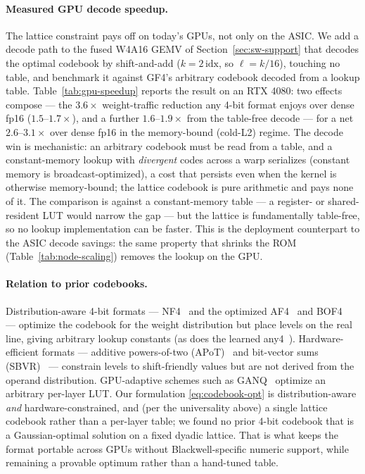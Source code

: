 \paragraph{Measured GPU decode speedup.} The lattice constraint pays off on
today's GPUs, not only on the ASIC. We add a decode path to the fused
W4A16 GEMV of Section~\ref{sec:sw-support} that decodes the optimal codebook by
shift-and-add ($k=2\,\mathrm{idx}$, so $\ell=k/16$), touching no table, and
benchmark it against GF4's arbitrary codebook decoded from a lookup table.
Table~\ref{tab:gpu-speedup} reports the result on an RTX 4080: two effects
compose --- the $3.6\times$ weight-traffic reduction any 4-bit format enjoys over
dense fp16 ($1.5$--$1.7\times$), and a further $1.6$--$1.9\times$ from the
table-free decode --- for a net $2.6$--$3.1\times$ over dense fp16 in the
memory-bound (cold-L2) regime. The decode win is mechanistic: an arbitrary
codebook must be read from a table, and a constant-memory lookup with
\emph{divergent} codes across a warp serializes (constant memory is
broadcast-optimized), a cost that persists even when the kernel is otherwise
memory-bound; the lattice codebook is pure arithmetic and pays none of it. The
comparison is against a constant-memory table --- a register- or shared-resident
LUT would narrow the gap --- but the lattice is fundamentally table-free, so no
lookup implementation can be faster. This is the deployment counterpart to the
ASIC decode savings: the same property that shrinks the ROM (Table~\ref{tab:node-scaling})
removes the lookup on the GPU.

\paragraph{Relation to prior codebooks.} Distribution-aware 4-bit formats ---
NF4~\cite{dettmers2023qlora} and the optimized AF4~\cite{yoshida2023af4} and
BOF4~\cite{blumenberg2026bof4} --- optimize the codebook for the weight
distribution but place levels on the real line, giving arbitrary lookup constants
(as does the learned any4~\cite{elhoushi2025any4}). Hardware-efficient formats ---
additive powers-of-two (APoT)~\cite{li2020apot} and bit-vector sums
(SBVR)~\cite{bang2025sbvr} --- constrain levels to shift-friendly values but are
not derived from the operand distribution. GPU-adaptive schemes such as
GANQ~\cite{zhao2025ganq} optimize an arbitrary per-layer LUT. Our formulation
\eqref{eq:codebook-opt} is distribution-aware \emph{and} hardware-constrained,
and (per the universality above) a single lattice codebook rather than a per-layer
table; we found no prior 4-bit codebook that is a Gaussian-optimal solution on a
fixed dyadic lattice. That is what keeps the format portable across GPUs without
Blackwell-specific numeric support, while remaining a provable optimum rather than
a hand-tuned table.
